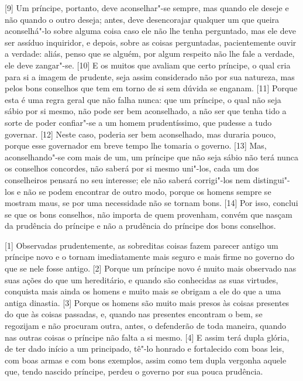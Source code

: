 {[}9{]} Um príncipe, portanto, deve aconselhar"-se sempre, mas quando ele
deseje e não quando o outro deseja; antes, deve desencorajar qualquer um
que queira aconselhá"-lo sobre alguma coisa caso ele não lhe tenha
perguntado, mas ele deve ser assíduo inquiridor, e depois, sobre as
coisas perguntadas, pacientemente ouvir a verdade: aliás, penso que se
alguém, por algum respeito não lhe fale a verdade, ele deve zangar"-se.
{[}10{]} E os muitos que avaliam que certo príncipe, o qual cria para si
a imagem de prudente, seja assim considerado não por sua natureza, mas
pelos bons conselhos que tem em torno de si sem dúvida se enganam.
{[}11{]} Porque esta é uma regra geral que não falha nunca: que um
príncipe, o qual não seja sábio por si mesmo, não pode ser bem
aconselhado, a não ser que tenha tido a sorte de poder confiar"-se a um
homem prudentíssimo, que pudesse a tudo governar. {[}12{]} Neste caso,
poderia ser bem aconselhado, mas duraria pouco, porque esse governador
em breve tempo lhe tomaria o governo. {[}13{]} Mas, aconselhando"-se com
mais de um, um príncipe que não seja sábio não terá nunca os conselhos
concordes, não saberá por si mesmo uni"-los, cada um dos conselheiros
pensará no seu interesse; ele não saberá corrigi"-los nem distingui"-los e
não se podem encontrar de outro modo, porque os homens sempre se mostram
maus, se por uma necessidade não se tornam bons. {[}14{]} Por isso,
conclui se que os bons conselhos, não importa de quem provenham, convém
que nasçam da prudência do príncipe e não a prudência do príncipe dos
bons conselhos.


{[}1{]} Observadas prudentemente, as sobreditas coisas fazem parecer
antigo um príncipe novo e o tornam imediatamente mais seguro e mais
firme no governo do que se nele fosse antigo. {[}2{]} Porque um príncipe
novo é muito mais observado nas suas ações do que um hereditário, e
quando são conhecidas as suas virtudes, conquista mais ainda os homens e
muito mais se obrigam a ele do que a uma antiga dinastia. {[}3{]} Porque
os homens são muito mais presos às coisas presentes do que às coisas
passadas, e, quando nas presentes encontram o bem, se regozijam e não
procuram outra, antes, o defenderão de toda maneira, quando nas outras
coisas o príncipe não falta a si mesmo. {[}4{]} E assim terá dupla
glória, de ter dado início a um principado, tê"-lo honrado e fortalecido
com boas leis, com boas armas e com bons exemplos, assim como tem dupla
vergonha aquele que, tendo nascido príncipe, perdeu o governo por sua
pouca prudência.

